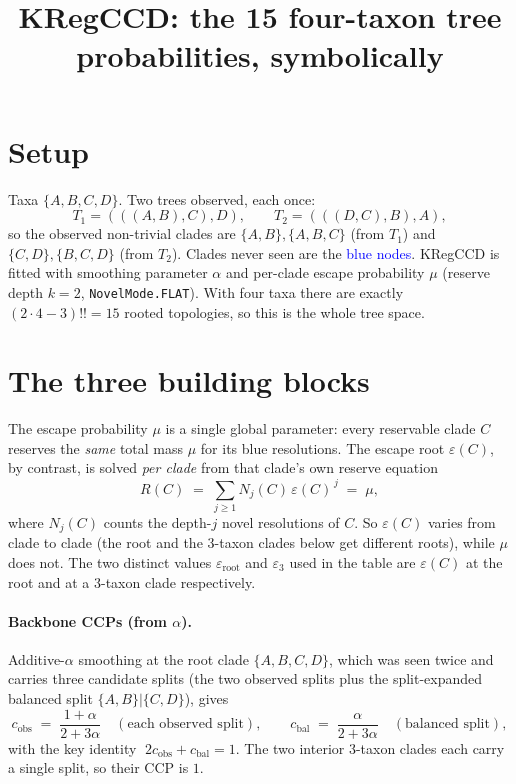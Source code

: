 \documentclass[11pt]{article}
\title{KRegCCD: the 15 four-taxon tree probabilities, symbolically}
\author{}
\date{}
\newcommand{\blue}[1]{\textcolor{blue}{#1}}
\newcommand{\cobs}{c_{\mathrm{obs}}}
\newcommand{\cbal}{c_{\mathrm{bal}}}
\newcommand{\eroot}{\varepsilon_{\mathrm{root}}}
\begin{document}
\maketitle
\vspace{-2.5em}

\section*{Setup}

Taxa $\{A,B,C,D\}$. Two trees observed, each once:
\[
T_1 = (((A,B),C),D), \qquad T_2 = (((D,C),B),A),
\]
so the observed non-trivial clades are $\{A,B\},\{A,B,C\}$ (from $T_1$) and
$\{C,D\},\{B,C,D\}$ (from $T_2$). Clades never seen are the \blue{blue nodes}.
KRegCCD is fitted with smoothing parameter $\alpha$ and per-clade escape
probability $\mu$ (reserve depth $k=2$, \texttt{NovelMode.FLAT}). With four taxa
there are exactly $(2\cdot4-3)!!=15$ rooted topologies, so this is the whole
tree space.

\section*{The three building blocks}

The escape probability $\mu$ is a single global parameter: every reservable
clade $C$ reserves the \emph{same} total mass $\mu$ for its blue resolutions. The
escape root $\varepsilon(C)$, by contrast, is solved \emph{per clade} from that
clade's own reserve equation
\[
R(C) \;=\; \sum_{j\ge 1} N_j(C)\,\varepsilon(C)^{\,j} \;=\; \mu ,
\]
where $N_j(C)$ counts the depth-$j$ novel resolutions of $C$. So $\varepsilon(C)$
varies from clade to clade (the root and the 3-taxon clades below get different
roots), while $\mu$ does not. The two distinct values $\eroot$ and
$\varepsilon_3$ used in the table are $\varepsilon(C)$ at the root and at a
3-taxon clade respectively.

\paragraph{Backbone CCPs (from $\alpha$).}
Additive-$\alpha$ smoothing at the root clade $\{A,B,C,D\}$, which was seen twice
and carries three candidate splits (the two observed splits plus the
split-expanded balanced split $\{A,B\}|\{C,D\}$), gives
\[
\cobs \;=\; \frac{1+\alpha}{2+3\alpha}
\quad(\text{each observed split}),
\qquad
\cbal \;=\; \frac{\alpha}{2+3\alpha}
\quad(\text{balanced split}),
\]
with the key identity $\;2\cobs+\cbal = 1$. The two interior 3-taxon clades each
carry a single split, so their CCP is $1$.
\end{document}

